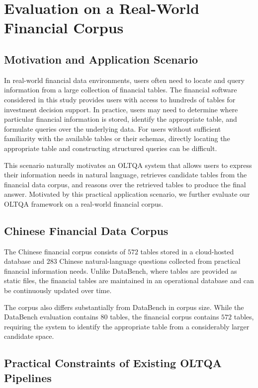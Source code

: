 \chapter{Evaluation on a Real-World Financial Corpus}

\section{Motivation and Application Scenario}

In real-world financial data environments, users often need to locate and query information from a large collection of financial tables.
The financial software considered in this study provides users with access to hundreds of tables for investment decision support.
In practice, users may need to determine where particular financial information is stored, identify the appropriate table, and formulate queries over the underlying data.
For users without sufficient familiarity with the available tables or their schemas, directly locating the appropriate table and constructing structured queries can be difficult.

This scenario naturally motivates an OLTQA system that allows users to express their information needs in natural language, retrieves candidate tables from the financial data corpus, and reasons over the retrieved tables to produce the final answer.
Motivated by this practical application scenario, we further evaluate our OLTQA framework on a real-world financial corpus.

\section{Chinese Financial Data Corpus}
The Chinese financial corpus consists of $572$ tables stored in a cloud-hosted database and $283$ Chinese natural-language questions collected from practical financial information needs.
Unlike DataBench, where tables are provided as static files, the financial tables are maintained in an operational database and can be continuously updated over time.

The corpus also differs substantially from DataBench in corpus size.
While the DataBench evaluation contains $80$ tables, the financial corpus contains $572$ tables, requiring the system to identify the appropriate table from a considerably larger candidate space.

\section{Practical Constraints of Existing OLTQA Pipelines}

